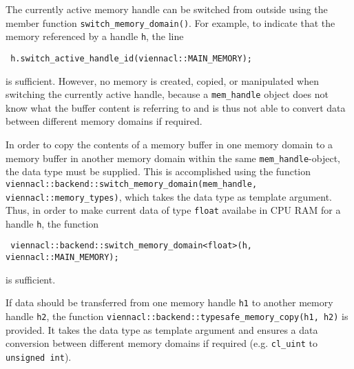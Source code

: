 The currently active memory handle can be switched from outside using the member function \lstinline|switch_memory_domain()|.
For example, to indicate that the memory referenced by a handle \lstinline|h|, the line
\begin{lstlisting}
 h.switch_active_handle_id(viennacl::MAIN_MEMORY);
\end{lstlisting}
is sufficient. However, no memory is created, copied, or manipulated when switching the currently active handle,
because a \lstinline|mem_handle| object does not know what the buffer content is referring to and is thus not able to convert data between different memory domains if required.

In order to copy the contents of a memory buffer in one memory domain to a memory buffer in another memory domain within the same \lstinline|mem_handle|-object, the data type must be supplied.
This is accomplished using the function \lstinline|viennacl::backend::switch_memory_domain(mem_handle, viennacl::memory_types)|, which takes the data type as template argument.
Thus, in order to make current data of type \lstinline|float| availabe in CPU RAM for a handle \lstinline|h|, the function
\begin{lstlisting}
 viennacl::backend::switch_memory_domain<float>(h, viennacl::MAIN_MEMORY);
\end{lstlisting}
is sufficient.

If data should be transferred from one memory handle \lstinline|h1| to another memory handle \lstinline|h2|, the function \lstinline|viennacl::backend::typesafe_memory_copy(h1, h2)| is provided.
It takes the data type as template argument and ensures a data conversion between different memory domains if required (e.g. \lstinline|cl_uint| to \lstinline|unsigned int|).


